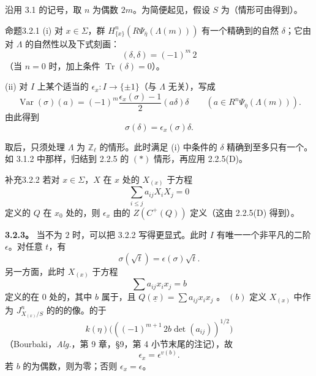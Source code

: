沿用 3.1 的记号，取 $n$ 为偶数 $2m$。为简便起见，假设 $S$ 为（情形可由得到）。
\begin{SGAresult}{命题}{3.2.1}
(i) 对 $x\in\Sigma$，群 $H^n_{\{x\}}(R\Psi_{\bar\eta}(\Lambda(m)))$ 有一个精确到的自然 $\delta$；它由对 $\Lambda$ 的自然性以及下式刻画：
\[
 (\delta,\delta)=(-1)^m\,2
\]
（当 $n=0$ 时，加上条件 $\operatorname{Tr}(\delta)=0$）。

(ii) 对 $I$ 上某个适当的 $\epsilon_x:I\to\{\pm1\}$（与 $\Lambda$ 无关），写成
\[
 \operatorname{Var}(\sigma)(a)=(-1)^m\frac{\epsilon_x(\sigma)-1}{2}(a\delta)\delta
 \qquad(a\in R^n\Psi_{\bar\eta}(\Lambda(m))).
\]
由此得到
\[
 \sigma(\delta)=\epsilon_x(\sigma)\delta.
\]
\end{SGAresult}
取后，只须处理 $\Lambda$ 为 $\mathbb Z_\ell$ 的情形。此时满足 (i) 中条件的 $\delta$ 精确到至多只有一个。如 3.1.2 中那样，归结到 2.2.5 的 $(*)$ 情形，再应用 2.2.5(D)。

\begin{SGAresult}{补充}{3.2.2}
若对 $x\in\Sigma$，$X$ 在 $x$ 处的 $X_{(x)}$ 于方程
\[
 \sum_{i\leq j}a_{ij}X_iX_j=0
\]
定义的 $Q$ 在 $x_0$ 处的，则 $\epsilon_x$ 由的 $Z(C^+(Q))$ 定义（这由 2.2.5(D) 得到）。
\end{SGAresult}
\textbf{3.2.3。} 当不为 $2$ 时，可以把 3.2.2 写得更显式。此时 $I$ 有唯一一个非平凡的二阶 $\epsilon$。对任意 $t$，有
\[
 \sigma(\sqrt t)=\epsilon(\sigma)\sqrt t.
\]
另一方面，此时 $X_{(x)}$ 于方程
\[
 \sum a_{ij}x_i x_j=b
\]
定义的在 $0$ 处的，其中 $b$ 属于，且 $Q(\underline x)=\sum a_{ij}x_i x_j$ 。 $(b)$ 定义 $X_{(x)}$ 中作为 $J^n_{X_{(x)}/S}$ 的的的像。的于
\[
 k(\eta)\bigl(((-1)^{m+1}\,2b\det(a_{ij}))^{1/2}\bigr)
\]
（Bourbaki，\textit{Alg.}，第 9 章，§9，第 4 小节末尾的注记），故
\[
 \epsilon_x=\epsilon^{v(b)}.
\]
若 $b$ 的为偶数，则为零；否则 $\epsilon_x=\epsilon$。

